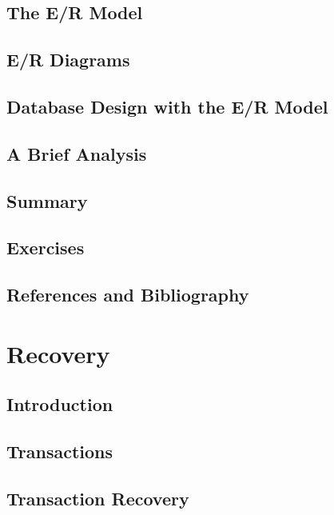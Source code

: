 \documentclass{book}
\begin{document}
\section{The E/R Model}

\section{E/R Diagrams}

\section{Database Design with the E/R Model}

\section{A Brief Analysis}

\section{Summary}

\section{Exercises}

\section{References and Bibliography}













\chapter{Recovery}

\section{Introduction}

\section{Transactions}

\section{Transaction Recovery}
\end{document}
